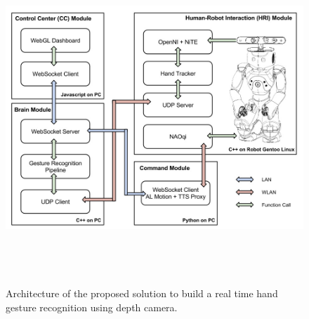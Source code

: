 \begin{figure}
	[h] \hspace{-10 mm} 
	\includegraphics[height=125mm]{figures/content/hri-architecture.jpg} \caption{Architecture of the proposed solution to build a real time hand gesture recognition using depth camera. } \label{fg:hri:architecture} 
\end{figure}
